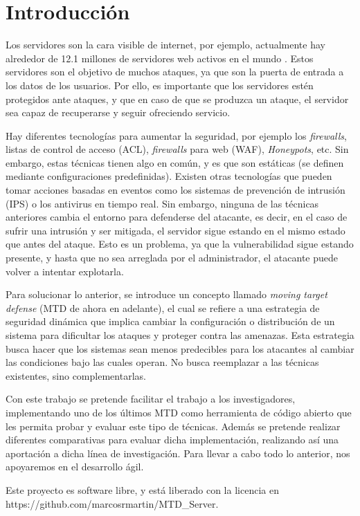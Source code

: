 \chapter{Introducción}

Los servidores son la cara visible de internet, por ejemplo, actualmente hay alrededor de 12.1 millones de servidores web activos en el mundo \cite{netcraft-agosto23}. Estos servidores son el objetivo de muchos ataques, ya que son la puerta de entrada a los datos de los usuarios.\cite{breaches-2023} Por ello, es importante que los servidores estén protegidos ante ataques, y que en caso de que se produzca un ataque, el servidor sea capaz de recuperarse y seguir ofreciendo servicio.

Hay diferentes tecnologías para aumentar la seguridad, por ejemplo los \textit{firewalls}, listas de control de acceso (ACL), \textit{firewalls} para web (WAF), \textit{Honeypots}, etc. Sin embargo, estas técnicas tienen algo en común, y es que son estáticas (se definen mediante configuraciones predefinidas). Existen otras tecnologías que pueden tomar acciones basadas en eventos como los sistemas de prevención de intrusión (IPS) o los antivirus en tiempo real. Sin embargo, ninguna de las técnicas anteriores cambia el entorno para defenderse del atacante, es decir, en el caso de sufrir una intrusión y ser mitigada, el servidor sigue estando en el mismo estado que antes del ataque. Esto es un problema, ya que la vulnerabilidad sigue estando presente, y hasta que no sea arreglada por el administrador, el atacante puede volver a intentar explotarla.

Para solucionar lo anterior, se introduce un concepto llamado \textit{moving target defense}\cite{big-state-of-art} (MTD de ahora en adelante), el cual se refiere a una estrategia de seguridad dinámica que implica cambiar la configuración o distribución de un sistema para dificultar los ataques y proteger contra las amenazas. Esta estrategia busca hacer que los sistemas sean menos predecibles para los atacantes al cambiar las condiciones bajo las cuales operan. No busca reemplazar a las técnicas existentes, sino complementarlas.

Con este trabajo se pretende facilitar el trabajo a los investigadores, implementando uno de los últimos MTD como herramienta de código abierto que les permita probar y evaluar este tipo de técnicas. Además se pretende realizar diferentes comparativas para evaluar dicha implementación, realizando así una aportación a dicha línea de investigación. Para llevar a cabo todo lo anterior, nos apoyaremos en el desarrollo ágil.

Este proyecto es software libre, y está liberado con la licencia\cite{gplv3} en https://github.com/marcosrmartin/MTD_Server.
